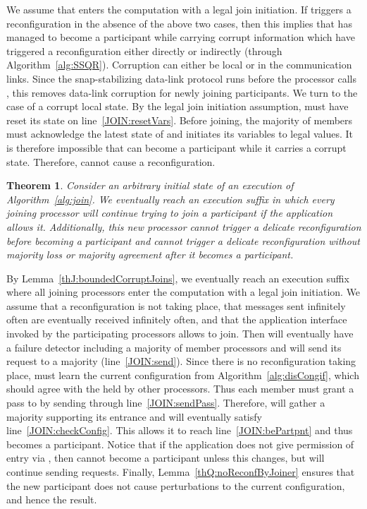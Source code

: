 \documentclass[11pt]{article}
\newtheorem{theorem}{Theorem}[section]
\newenvironment{proof}{\noindent{\bf Proof.}}{\hfill}
\begin{document}
\begin{proof}
We assume that  enters the computation with a legal join initiation. 
If  triggers a reconfiguration in the absence of the above two cases, then this implies that  has managed to become a participant while carrying corrupt information which have triggered a reconfiguration either directly or indirectly (through Algorithm~\ref{alg:SSQR}).
Corruption can either be local or in the communication links.
Since the snap-stabilizing data-link protocol runs before the processor calls , this removes data-link corruption for newly joining participants. 
We turn to the case of a corrupt local state.
By the legal join initiation assumption,  must have reset its state on line~\ref{JOIN:resetVars}.
Before joining, the majority of members must acknowledge the latest state of  and  initiates its variables to legal values.
It is therefore impossible that  can become a participant while it carries a corrupt state.
Therefore,  cannot cause a reconfiguration.
\end{proof}

\begin{theorem}
\label{thJ:finalApp}
Consider an arbitrary initial state of an execution  of Algorithm~\ref{alg:join}. 
We eventually reach an execution suffix in which every joining processor  will continue trying to join a participant if the application allows it. Additionally, this new processor cannot trigger a delicate reconfiguration before becoming a participant and cannot trigger a delicate reconfiguration without majority loss or majority agreement after it becomes a participant.
\end{theorem}

\begin{proof}
By Lemma~\ref{thJ:boundedCorruptJoins}, we eventually reach an execution suffix where all joining processors enter the computation with a legal join initiation.
We assume that a reconfiguration is not taking place, that messages sent infinitely often are eventually received infinitely often, and that the application interface invoked by the participating processors allows  to join. 
Then  will eventually have a failure detector including a majority of member processors and will send its  request to a majority (line~\ref{JOIN:send}).
Since there is no reconfiguration taking place,  must learn the current configuration from Algorithm~\ref{alg:disCongif}, which should agree with the  held by other processors.
Thus each member must grant a pass to  by sending  through line~\ref{JOIN:sendPass}.
Therefore,  will gather a majority supporting its entrance and will eventually satisfy line~\ref{JOIN:checkConfig}.
This allows it to reach line~\ref{JOIN:bePartpnt} and thus  becomes a participant.
Notice that if the application does not give permission of entry via , then  cannot become a participant unless this changes, but  will continue sending requests.
Finally, Lemma~\ref{thQ:noReconfByJoiner} ensures that the new participant does not cause perturbations to the current configuration, and hence the result. 
\end{proof}
\end{document}
